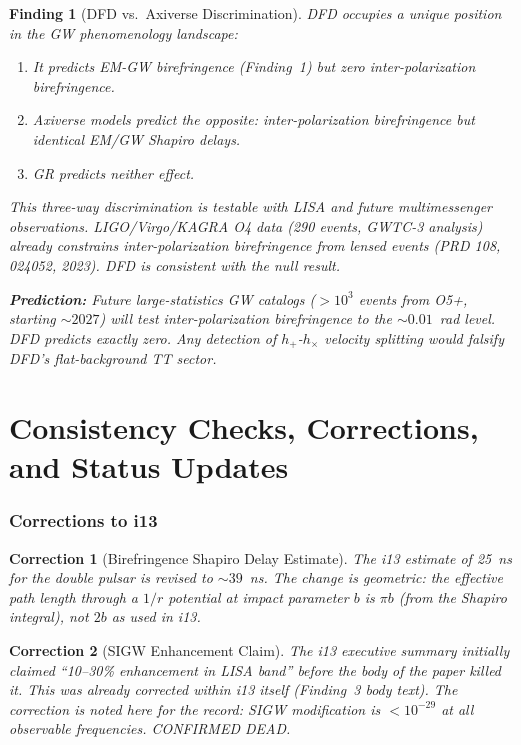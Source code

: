 \documentclass[11pt]{article}
\newtheorem{finding}{Finding}
\newtheorem{correction}{Correction}
\begin{document}
\begin{finding}[DFD vs.\ Axiverse Discrimination]
\label{find:axiverse}
DFD occupies a unique position in the GW phenomenology landscape:
\begin{enumerate}[nosep]
\item It predicts EM-GW birefringence (Finding~1) but zero
  inter-polarization birefringence.
\item Axiverse models predict the opposite: inter-polarization
  birefringence but identical EM/GW Shapiro delays.
\item GR predicts neither effect.
\end{enumerate}

This three-way discrimination is testable with LISA and future
multimessenger observations. LIGO/Virgo/KAGRA O4 data
(290 events, GWTC-3 analysis) already constrains inter-polarization
birefringence from lensed events (PRD 108, 024052, 2023). DFD is
consistent with the null result.

\textbf{Prediction:} Future large-statistics GW catalogs ($> 10^3$
events from O5+, starting $\sim 2027$) will test inter-polarization
birefringence to the $\sim 0.01$~rad level. DFD predicts exactly
zero. Any detection of $h_+$-$h_\times$ velocity splitting would
falsify DFD's flat-background TT sector.
\end{finding}


\part{Consistency Checks, Corrections, and Status Updates}

\section{Corrections to i13}

\begin{correction}[Birefringence Shapiro Delay Estimate]
The i13 estimate of 25~ns for the double pulsar is revised to
$\sim 39$~ns. The change is geometric: the effective path length
through a $1/r$ potential at impact parameter $b$ is $\pi b$
(from the Shapiro integral), not $2b$ as used in i13.
\end{correction}

\begin{correction}[SIGW Enhancement Claim]
The i13 executive summary initially claimed ``10--30\% enhancement
in LISA band'' before the body of the paper killed it. This was
already corrected within i13 itself (Finding~3 body text). The
correction is noted here for the record: SIGW modification is
$< 10^{-29}$ at all observable frequencies. CONFIRMED DEAD.
\end{correction}
\end{document}

